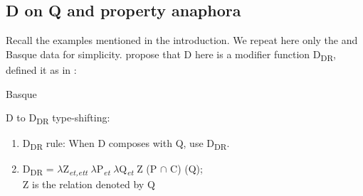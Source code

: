 \documentclass[output=paper,
modfonts
]{langscibook}
\begin{document}
\subsection{D on Q and property anaphora}

Recall the examples mentioned in the introduction. We repeat here only the  and Basque data for simplicity. \citet{etxeberria-giannakidou2009, etxeberria-giannakidou2014} propose that D here is a modifier function D\textsubscript{DR}, defined it as in :

\ea\label{ex:etxeberria:16}
 \citep{Giannakidou2004}
\z
\z\pagebreak

\ea\label{ex:etxeberria:17} 
Basque \citep{etxeberria2005}
\z
\z

\ea\label{ex:etxeberria:18}
	D to D\textsubscript{DR} type-shifting:
	\begin{enumerate}
		\item D\textsubscript{DR} rule: When D composes with Q, use D\textsubscript{DR}.
		\item D\textsubscript{DR} = $\lambda$Z\textsubscript{\textit{et,ett}} $\lambda$P\textsubscript{\textit{et}} $\lambda$Q\textsubscript{\textit{et}} Z (P $\cap$ C) (Q);\\ Z is the relation denoted by Q
	\end{enumerate}
\z
\end{document}
